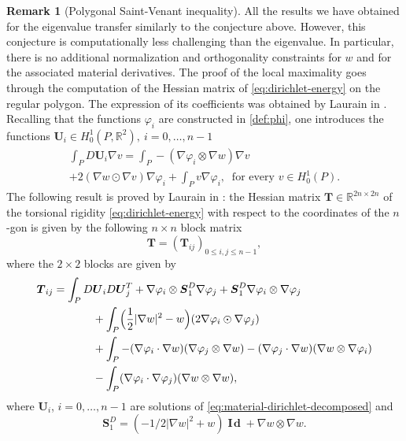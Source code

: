 \documentclass[11pt]{article}
\numberwithin{equation}{section}\newtheorem*{jepEnonce}{\jepEnonceTitle}\newenvironment{enonce*}[1]{\def\jepEnonceTitle{#1}\jepEnonce}{\endjepEnonce}\newtheorem*{conj*}{Conjecture}
\theoremstyle{plain}
\theoremstyle{definition}
\newtheorem{rem}[thm]{Remark}
\newcommand{\bo}[1]{{\boldsymbol#1}}
\newcommand{\Id}{\operatorname{{\bo I\!\bo d}}}
\let\Bbb\mathbb
\begin{document}
\begin{rem}[Polygonal Saint-Venant inequality]
All the results we have obtained for the eigenvalue transfer similarly to the conjecture above. However, this conjecture is computationally less challenging than the eigenvalue. In particular, there is no additional normalization and orthogonality constraints for $w$ and for the associated material derivatives. The proof of the local maximality goes through the computation of the Hessian matrix of \eqref{eq:dirichlet-energy} on the regular polygon. The expression of its coefficients was obtained by Laurain in \cite{laurain2ndDeriv}.
Recalling that the functions $\varphi_i$ are constructed in \eqref{def:phi},
one introduces the functions $\bo U_i \in H_0^1(P,\Bbb{R}^2),\ i=0,\dots,n-1$
\vspace*{-5pt}
\begin{multline}
\int_P D\bo U_i \nabla v
= \int_P -(\nabla \varphi_i \otimes \nabla w)\nabla v\\[-8pt]
+ 2 (\nabla w \odot \nabla v)\nabla \varphi_i + \int_P v \nabla \varphi_i,\ \text{ for every } v \in H_0^1(P).
\label{eq:material-dirichlet-decomposed}
\end{multline}
The following result is proved by Laurain in \cite[Prop.\,14]{laurain2ndDeriv}: the Hessian matrix $\bo T \in \Bbb{R}^{2n\times 2n}$ of the torsional rigidity \eqref{eq:dirichlet-energy} with respect to the coordinates of the $n$-gon is given by the following $n\times n$ block matrix
\[
\bo T = (\bo T_{ij})_{0\leq i,j\leq n-1},
\]
where the $2\times 2$ blocks are given by
\begin{equation}
\label{eq:Hessian-Dir-block}
\begin{aligned}
\bo T_{ij} = \int_P D&\bo U_i D\bo U_j^T + \nabla \varphi_i \otimes \bo S_1^D \nabla \varphi_j + \bo S_1^D \nabla \varphi_i \otimes \nabla \varphi_j \\
& +\int_P \Bigl(\frac{1}{2}|\nabla w|^2 - w\Bigr) (2 \nabla \varphi_i \odot \nabla \varphi_j) \\
& +\int_P-(\nabla \varphi_i\cdot \nabla w)(\nabla \varphi_j \otimes \nabla w)-(\nabla \varphi_j \cdot \nabla w)(\nabla w \otimes \nabla \varphi_i) \\
&-\int_P(\nabla \varphi_i \cdot \nabla \varphi_j)(\nabla w \otimes \nabla w),
\end{aligned}
\end{equation}
where $\bo U_i$, $i=0,\dots,n-1$ are solutions of \eqref{eq:material-dirichlet-decomposed} and
\[
\bo S_1^D = (-1/2|\nabla w|^2 +w)\Id +\nabla w \otimes \nabla w.
\]
\end{rem}
\end{document}
